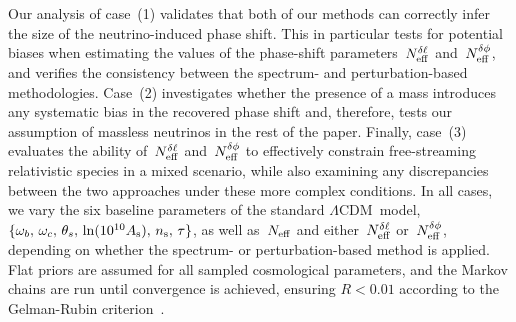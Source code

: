 Our analysis of case~(1) validates that both of our methods can correctly infer the size of the neutrino-induced phase shift. This in particular tests for potential biases when estimating the values of the phase-shift parameters~$N_\mathrm{eff}^{\delta\ell}$ and~$N_\mathrm{eff}^{\delta\phi}$, and verifies the consistency between the spectrum- and perturbation-based methodologies. Case~(2) investigates whether the presence of a mass introduces any systematic bias in the recovered phase shift and, therefore, tests our assumption of massless neutrinos in the rest of the paper. Finally, case~(3) evaluates the ability of~$N_\mathrm{eff}^{\delta\ell}$ and~$N_\mathrm{eff}^{\delta\phi}$ to effectively constrain free-streaming relativistic species in a mixed scenario, while also examining any discrepancies between the two approaches under these more complex conditions. In all cases, we vary the six baseline parameters of the standard $\Lambda$CDM~model, $\{\omega_b,\,\omega_c,\,\theta_s,\,\ln(10^{10}A_\mathrm{s}),\,n_\mathrm{s},\,\tau\}$, as well as~$N_\mathrm{eff}$ and either~$N_\mathrm{eff}^{\delta\ell}$ or~$N_\mathrm{eff}^{\delta\phi}$, depending on whether the spectrum- or perturbation-based method is applied. Flat priors are assumed for all sampled cosmological parameters, and the Markov chains are run until convergence is achieved, ensuring $R < 0.01$ according to the Gelman-Rubin criterion~\cite{Gelman:1992zz}.\medskip

